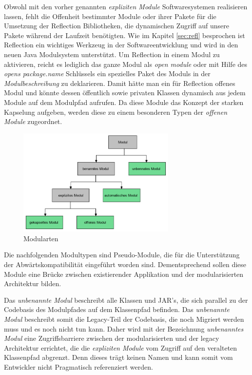     Obwohl mit den vorher genannten \textit{expliziten Module} Softwaresystemen realisieren lassen, fehlt die Offenheit bestimmter Module oder ihrer Pakete für die Umsetzung der Reflection Bibliotheken, die dynamischen Zugriff auf unsere Pakete während der Laufzeit benötigten. Wie im Kapitel \ref{sec:refl} besprochen ist Reflection ein wichtiges Werkzeug in der Softwareentwicklung und wird in den neuen Java Modulsystem unterstützt. Um Reflection in einem Modul zu aktivieren, reicht es lediglich das ganze Modul als \textit{open module} oder mit Hilfe des \textit{opens package.name} Schlüssels ein spezielles Paket des Moduls in der \textit{Modulbeschreibung} zu deklarieren. Damit hätte man ein für Reflection offenes Modul und könnte dessen öffentlich sowie privaten Klassen dynamisch aus jedem Module auf dem Modulpfad aufrufen. Da diese Module das Konzept der starken Kapselung aufgeben, werden diese zu einem besonderen Typen der \textit{offenen Module} zugeordnet.

    \begin{figure}[h]
      \centering
      \includegraphics[width=0.7\textwidth]{material/images/module-tree.png}
      \caption{Modularten}
      \label{fig:modtree}
    \end{figure}

    Die nachfolgenden Modultypen sind Pseudo-Module, die für die Unterstützung der Abwärtskompatibilität eingeführt worden sind. 
    Dementsprechend sollen diese Module eine Brücke zwischen existierender Applikation und der modularisierten Architektur bilden.\bigbreak


    Das \textit{unbenannte Modul} beschreibt alle Klassen und JAR's, die sich parallel zu der Codebasis des Modulpfades auf dem Klassenpfad befinden. Das \textit{unbenannte Modul} beschreibt somit die Legacy-Teil der Codebasis, die noch Migriert werden muss und es noch nicht tun kann. Daher wird mit der Bezeichnung \textit{unbenanntes Modul} eine Zugriffsbarriere zwischen der modularisierten und der legacy Architektur errichtet, die die \textit{expliziten Module} vom Zugriff auf den veralteten Klassenpfad abgrenzt. Denn dieses trägt keinen Namen und kann somit vom Entwickler nicht Pragmatisch referenziert werden.


